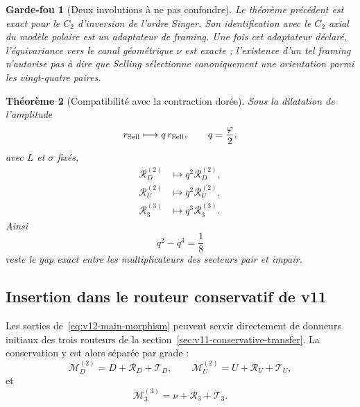 \documentclass[11pt,a4paper]{article}
\newtheorem{theorem}{Théorème}[section]
\newtheorem{guardrail}[theorem]{Garde-fou}
\begin{document}
\begin{guardrail}[Deux involutions à ne pas confondre]
Le théorème précédent est exact pour le $C_2$ d'inversion de l'ordre Singer. Son identification avec le $C_2$ axial du modèle polaire est un adaptateur de framing. Une fois cet adaptateur déclaré, l'équivariance vers le canal géométrique $\nu$ est exacte ; l'existence d'un tel framing n'autorise pas à dire que Selling sélectionne canoniquement une orientation parmi les vingt-quatre paires.
\end{guardrail}

\begin{theorem}[Compatibilité avec la contraction dorée]\label{thm:v12-golden}
Sous la dilatation de l'amplitude
\[
 r_{\rm Sell}\longmapsto q\,r_{\rm Sell},
 \qquad q=\frac{\varphi}{2},
\]
avec $L$ et $\sigma$ fixés,
\begin{equation}\label{eq:v12-golden}
 \boxed{
 \begin{aligned}
 \mathscr R_D^{(2)}&\longmapsto q^2\mathscr R_D^{(2)},\\
 \mathscr R_U^{(2)}&\longmapsto q^2\mathscr R_U^{(2)},\\
 \mathscr R_3^{(3)}&\longmapsto q^3\mathscr R_3^{(3)}.
 \end{aligned}}
\end{equation}
Ainsi
\[
 \boxed{q^2-q^3=\frac18}
\]
reste le gap exact entre les multiplicateurs des secteurs pair et impair.
\end{theorem}

\subsection{Insertion dans le routeur conservatif de v11}

Les sorties de~\eqref{eq:v12-main-morphism} peuvent servir directement de donneurs initiaux des trois routeurs de la section~\ref{sec:v11-conservative-transfer}. La conservation y est alors séparée par grade :
\[
 \mathcal M_D^{(2)}
 =
 D+\mathscr R_D+\mathscr T_D,
 \qquad
 \mathcal M_U^{(2)}
 =
 U+\mathscr R_U+\mathscr T_U,
\]
et
\[
 \mathcal M_3^{(3)}
 =
 \nu+\mathscr R_3+\mathscr T_3.
\]
\end{document}
